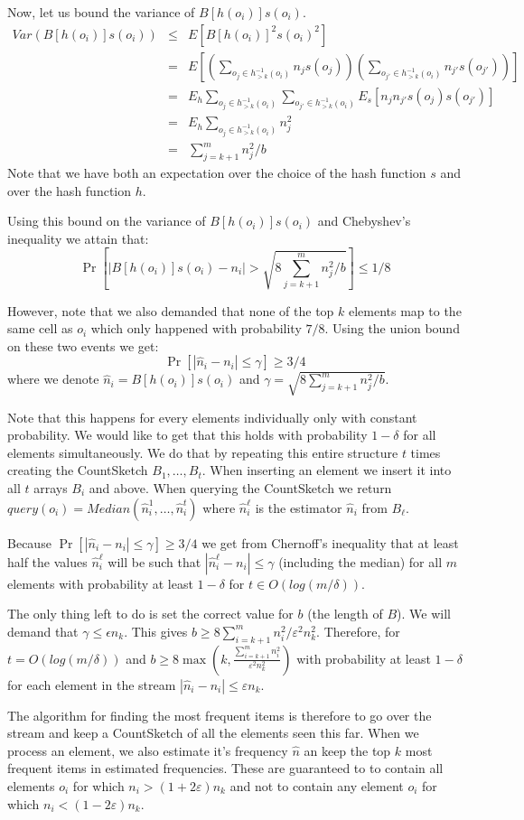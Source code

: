 \documentclass{article}
\newcommand{\eps}{\varepsilon}
\begin{document}
Now, let us bound the variance of $B[h(o_i)]s(o_i)$.
\begin{eqnarray*}
Var(B[h(o_i)]s(o_i)) &\le & E[B[h(o_i)]^2 s(o_i)^2] \\
&=& E[(\sum_{o_j \in h^{-1}_{>k}(o_i)} n_j s(o_j))(\sum_{o_{j'} \in h^{-1}_{>k}(o_i)} n_{j'} s(o_{j'}))]\\
&= & E_h \sum_{o_j \in h^{-1}_{>k}(o_i)} \sum_{o_{j'} \in h^{-1}_{>k}(o_i)} E_s [n_j n_{j'} s(o_j) s(o_{j'}) ]\\
&= &E_h  \sum_{o_j \in h^{-1}_{>k}(o_i)}n^2_j \\
&= &\sum_{j = k+1}^{m}n^2_j / b
\end{eqnarray*}
Note that we have both an expectation over the choice of the hash function $s$ and over the hash function $h$.

Using this bound on the variance of $B[h(o_i)]s(o_i)$ and Chebyshev's inequality we attain that:
$$
\Pr\left[ \left| B[h(o_i)]s(o_i) - n_i \right| > \sqrt{8 \sum_{j = k+1}^{m}n^2_j / b} \right] \le 1/8
$$

However, note that we also demanded that none of the top $k$ elements map to the same cell as $o_i$
which only happened with probability $7/8$. Using the union bound on these two events we get:   
$$
\Pr\left[ \left| \hat{n}_i - n_i \right| \le \gamma \right] \ge 3/4
$$
where we denote $\hat{n}_i =  B[h(o_i)]s(o_i)$ and $\gamma = \sqrt{8 \sum_{j = k+1}^{m}n^2_j / b}$.

Note that this happens for every elements individually only with constant probability.
We would like to get that this holds with probability $1-\delta$ for all elements simultaneously.
We do that by repeating this entire structure $t$ times creating the CountSketch $B_1,\ldots,B_t$.
When inserting an element we insert it into all $t$ arrays $B_i$ and above. 
When querying the CountSketch we return $query(o_i) = Median(\hat{n}^1_i,\ldots,\hat{n}^t_i)$ where $\hat{n}^\ell_i$
is the estimator $\hat{n}_i$ from $B_\ell$. 

Because $\Pr\left[ \left| \hat{n}_i - n_i \right| \le \gamma \right] \ge 3/4$ we get from Chernoff's inequality that
at least half the values $\hat{n}^\ell_i$ will be such that $\left| \hat{n}^\ell_i - n_i \right| \le \gamma$ (including the median)
for all $m$ elements with probability at least $1-\delta$ for $t \in O(log(m/\delta))$.

The only thing left to do is set the correct value for $b$ (the length of $B$).
We will demand that $\gamma \le \epsilon n_k$. This gives $b \ge 8\sum_{i=k+1}^{m}n^2_i/\eps^2 n_k^2$.
Therefore, for $t = O(log(m/\delta))$ and $b \ge 8\max(k,\frac{\sum_{i=k+1}^{m}n^2_i}{\eps^2 n_k^2})$
with probability at least $1-\delta$ for each element in the stream $|\hat{n}_i - n_i| \le \eps n_k$.



The algorithm for finding the most frequent items is therefore to go over the stream and keep a CountSketch 
of all the elements seen this far. When we process an element, we also estimate it's frequency $\hat{n}$ an keep the top $k$
most frequent items in estimated frequencies. These are guaranteed to to contain all elements $o_i$ for which $n_i > (1+2\eps)n_k$
and not to contain any element  $o_i$ for which $n_i < (1-2\eps)n_k$.
\end{document}
